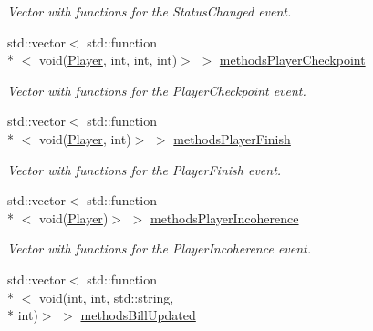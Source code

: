 \begin{DoxyCompactItemize}
\begin{DoxyCompactList}\small\item\em Vector with functions for the Status\-Changed event. \end{DoxyCompactList}\item 
\hypertarget{classEventManager_aec8534b0e9229a761981003a749c8749}{std\-::vector$<$ std\-::function\\*
$<$ void(\hyperlink{structPlayer}{Player}, int, int, int)$>$ $>$ \hyperlink{classEventManager_aec8534b0e9229a761981003a749c8749}{methods\-Player\-Checkpoint}}\label{classEventManager_aec8534b0e9229a761981003a749c8749}

\begin{DoxyCompactList}\small\item\em Vector with functions for the Player\-Checkpoint event. \end{DoxyCompactList}\item 
\hypertarget{classEventManager_a3d205a716dd8f5c7380090c026c785db}{std\-::vector$<$ std\-::function\\*
$<$ void(\hyperlink{structPlayer}{Player}, int)$>$ $>$ \hyperlink{classEventManager_a3d205a716dd8f5c7380090c026c785db}{methods\-Player\-Finish}}\label{classEventManager_a3d205a716dd8f5c7380090c026c785db}

\begin{DoxyCompactList}\small\item\em Vector with functions for the Player\-Finish event. \end{DoxyCompactList}\item 
\hypertarget{classEventManager_a9c473cd5e559ffd730c95fb6476890a1}{std\-::vector$<$ std\-::function\\*
$<$ void(\hyperlink{structPlayer}{Player})$>$ $>$ \hyperlink{classEventManager_a9c473cd5e559ffd730c95fb6476890a1}{methods\-Player\-Incoherence}}\label{classEventManager_a9c473cd5e559ffd730c95fb6476890a1}

\begin{DoxyCompactList}\small\item\em Vector with functions for the Player\-Incoherence event. \end{DoxyCompactList}\item 
\hypertarget{classEventManager_a0497e6be361d83e2c4dc8d0b5e20360a}{std\-::vector$<$ std\-::function\\*
$<$ void(int, int, std\-::string, \\*
int)$>$ $>$ \hyperlink{classEventManager_a0497e6be361d83e2c4dc8d0b5e20360a}{methods\-Bill\-Updated}}\label{classEventManager_a0497e6be361d83e2c4dc8d0b5e20360a}


\end{DoxyCompactItemize}
